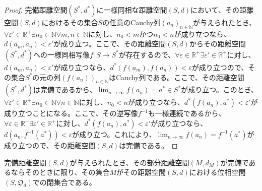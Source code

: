 \documentclass[dvipdfmx]{jsarticle}
\begin{document}
\begin{proof}
完備距離空間$\left( S^{*},d^{*} \right)$に一様同相な距離空間$(S,d)$において、その距離空間$(S,d)$におけるその集合$S$の任意のCauchy列$\left( a_{n} \right)_{n \in \mathbb{N}}$が与えられたとき、$\forall\varepsilon' \in \mathbb{R}^{+}\exists n_{0} \in \mathbb{N}\forall m,n \in \mathbb{N}$に対し、$n_{0} < m$かつ$n_{0} < n$が成り立つなら、$d\left( a_{m},a_{n} \right) < \varepsilon'$が成り立つ。ここで、その距離空間$(S,d)$からその距離空間$\left( S^{*},d^{*} \right)$への一様同相写像$f:S \rightarrow S^{*}$が存在するので、$\forall\varepsilon \in \mathbb{R}^{+}\exists\varepsilon' \in \mathbb{R}^{+}$に対し、$d\left( a_{m},a_{n} \right) < \varepsilon'$が成り立つなら、$d^{*}\left( f\left( a_{m} \right),f\left( a_{n} \right) \right) < \varepsilon$が成り立つので、その集合$S^{*}$の元の列$\left( f\left( a_{n} \right) \right)_{n \in \mathbb{N}}$はCauchy列である。ここで、その距離空間$\left( S^{*},d^{*} \right)$は完備であるから、$\lim_{n \rightarrow \infty}{f\left( a_{n} \right)} = a^{*} \in S^{*}$が成り立つ。このとき、$\forall\varepsilon' \in \mathbb{R}^{+}\exists n_{0} \in \mathbb{N}\forall n \in \mathbb{N}$に対し、$n_{0} < n$が成り立つなら、$d^{*}\left( f\left( a_{n} \right),a^{*} \right) < \varepsilon'$が成り立つことになる。ここで、その逆写像$f^{- 1}$も一様連続であるから、$\forall\varepsilon \in \mathbb{R}^{+}\exists\varepsilon' \in \mathbb{R}^{+}$に対し、$d^{*}\left( f\left( a_{n} \right),a^{*} \right) < \varepsilon'$が成り立つなら、$d\left( a_{n},f^{- 1}\left( a^{*} \right) \right) < \varepsilon$が成り立つ。これにより、$\lim_{n \rightarrow \infty}{f\left( a_{n} \right)} = f^{- 1}\left( a^{*} \right)$が成り立つので、その距離空間$(S,d)$は完備である。
\end{proof}
\begin{thm}\label{8.2.4.9}
完備距離空間$(S,d)$が与えられたとき、その部分距離空間$\left( M,d_{M} \right)$が完備であるならそのときに限り、その集合$M$がその距離空間$(S,d)$における位相空間$\left( S,\mathfrak{O}_{d} \right)$での閉集合である。
\end{thm}
\end{document}
